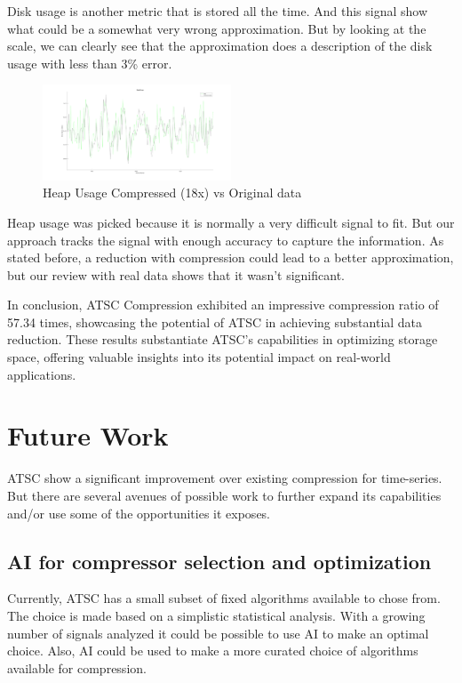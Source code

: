 \documentclass[conference]{IEEEtran}
\begin{document}
Disk usage is another metric that is stored all the time.
And this signal show what could be a somewhat very wrong approximation.
But by looking at the scale, we can clearly see that the approximation does a description of the disk usage with less than 3\% error.

  \begin{figure}[h]
    \centering
    \includegraphics[width=0.5\textwidth]{heap-usage-validation.png}
    \caption{Heap Usage Compressed (18x) vs Original data}
    \label{heap}
  \end{figure}
\vspace{10pt}

Heap usage was picked because it is normally a very difficult signal to fit. But our approach tracks the signal with enough accuracy to capture the information. 
As stated before, a reduction with compression could lead to a better approximation, but our review with real data shows that it wasn't significant.

In conclusion, ATSC Compression exhibited an impressive compression ratio of 57.34 times, showcasing the potential of ATSC in achieving substantial data reduction. 
These results substantiate ATSC's capabilities in optimizing storage space, offering valuable insights into its potential impact on real-world applications. 

\section{Future Work}

ATSC show a significant improvement over existing compression for time-series. But there are several avenues of possible work to further expand its capabilities and/or use some of the opportunities it exposes.

\subsection{AI for compressor selection and optimization}

Currently, ATSC has a small subset of fixed algorithms available to chose from. The choice is made based on a simplistic statistical analysis. With a growing number of signals analyzed it could be possible to use AI to make an optimal choice. 
Also, AI could be used to make a more curated choice of algorithms available for compression.
\end{document}

